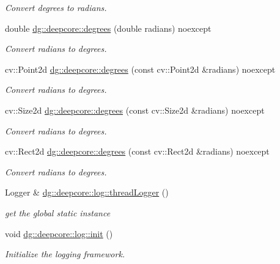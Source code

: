 \begin{DoxyCompactItemize}
\begin{DoxyCompactList}\small\item\em Convert degrees to radians. \end{DoxyCompactList}\item 
double \hyperlink{group___utility_module_gac74d2fa0aeac8bd310ed61663a153e84}{dg\+::deepcore\+::degrees} (double radians) noexcept
\begin{DoxyCompactList}\small\item\em Convert radians to degrees. \end{DoxyCompactList}\item 
cv\+::\+Point2d \hyperlink{group___utility_module_ga8ee006518e8f0489aa3e18166d74c6fe}{dg\+::deepcore\+::degrees} (const cv\+::\+Point2d \&radians) noexcept
\begin{DoxyCompactList}\small\item\em Convert radians to degrees. \end{DoxyCompactList}\item 
cv\+::\+Size2d \hyperlink{group___utility_module_gaa1f8aec2237eca2394ae5df2528e8eca}{dg\+::deepcore\+::degrees} (const cv\+::\+Size2d \&radians) noexcept
\begin{DoxyCompactList}\small\item\em Convert radians to degrees. \end{DoxyCompactList}\item 
cv\+::\+Rect2d \hyperlink{group___utility_module_ga1be3f98796bf80ec2aa5899e73269be7}{dg\+::deepcore\+::degrees} (const cv\+::\+Rect2d \&radians) noexcept
\begin{DoxyCompactList}\small\item\em Convert radians to degrees. \end{DoxyCompactList}\item 
Logger \& \hyperlink{group___utility_module_ga94a3335f72a1830e58c8386c35015b2b}{dg\+::deepcore\+::log\+::thread\+Logger} ()
\begin{DoxyCompactList}\small\item\em get the global static instance \end{DoxyCompactList}\item 
void \hyperlink{group___utility_module_gaedfd950d41ec88d7eff2a7a9929e45e8}{dg\+::deepcore\+::log\+::init} ()
\begin{DoxyCompactList}\small\item\em Initialize the logging framework. \end{DoxyCompactList}\item 

\end{DoxyCompactItemize}
